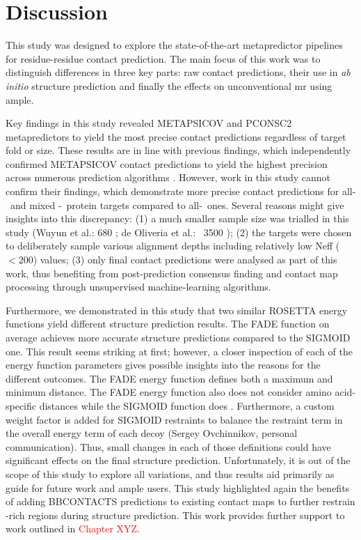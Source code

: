 \section{Discussion}
This study was designed to explore the state-of-the-art metapredictor pipelines for residue-residue contact prediction. The main focus of this work was to distinguish differences in three key parts: raw contact predictions, their use in  \textit{ab initio} structure prediction and finally the effects on unconventional \gls{mr} using \gls{ample}.

Key findings in this study revealed METAPSICOV and PCONSC2 metapredictors to yield the most precise contact predictions regardless of target fold or size. These results are in line with previous findings, which independently confirmed METAPSICOV contact predictions to yield the highest precision across numerous prediction algorithms \cite{Wuyun2016-tx, De_Oliveira2017-yf}. However, work in this study cannot confirm their findings, which demonstrate more precise contact predictions for all-\textbeta\ and mixed \textalpha-\textbeta\ protein targets compared to all-\textalpha\ ones. Several reasons might give insights into this discrepancy: (1) a much smaller sample size was trialled in this study (Wuyun et al.: 680 \cite{Wuyun2016-tx}; de Oliveria et al.: ~3500 \cite{De_Oliveira2017-yf}); (2) the targets were chosen to deliberately sample various alignment depths including relatively low Neff ($<200$) values; (3) only final contact predictions were analysed as part of this work, thus benefiting from post-prediction consensus finding and contact map processing through unsupervised machine-learning algorithms.

Furthermore, we demonstrated in this study that two similar ROSETTA energy functions yield different structure prediction results. The FADE function on average achieves more accurate structure predictions compared to the SIGMOID one. This result seems striking at first; however, a closer inspection of each of the energy function parameters gives possible insights into the reasons for the different outcomes. The FADE energy function defines both a maximum and minimum distance. The FADE energy function also does not consider amino acid-specific distances while the SIGMOID function does \cite{Kamisetty2013-bs}. Furthermore, a custom weight factor is added for SIGMOID restraints to balance the restraint term in the overall energy term of each decoy (Sergey Ovchinnikov, personal communication). Thus, small changes in each of those definitions could have significant effects on the final structure prediction. Unfortunately, it is out of the scope of this study to explore all variations, and thus results aid primarily as guide for future work and \gls{ample} users. This study highlighted again the benefits of adding BBCONTACTS predictions to existing contact maps to further restrain \textbeta-rich regions during structure prediction. This work provides further support to work outlined in \textcolor{red}{Chapter XYZ}.

